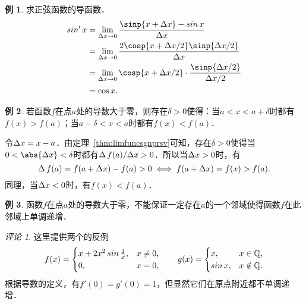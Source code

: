 \documentclass[a4paper,punct=CCT]{ctexbook}
\makeatletter
\theoremstyle{definition}
\newtheorem*{example*}{例}
\theoremstyle{remark}
\newtheorem*{remark}{评论}
\renewcommand*{\proofname}{证}
\renewenvironment{proof}[1][\proofname]{\par
  \pushQED{\qed}%
  \normalfont \topsep6\p@\@plus6\p@\relax
  \trivlist
  \item[\hskip\labelsep
    \bfseries
    #1%
    ]\ignorespaces
}{%
  \popQED\endtrivlist\@endpefalse
}
\makeatother
\begin{document}
\begin{example*}
  求正弦函数的导函数．
  \begin{align*}
    \sin'x
    &= \lim_{\fwdf x \to 0} \frac{\sinp{x+\fwdf x}- \sin x}{\fwdf x} \\
    &= \lim_{\fwdf x \to 0} \frac{2 \cosp{x+\fwdf x/2} \sinp{\fwdf x/2}}{\fwdf x} \\
    &= \lim_{\fwdf x \to 0} \cosp{x+\fwdf x/2} \cdot \frac{\sinp{\fwdf x/2}}{\fwdf x/2} \\
    &= \cos x.
  \end{align*}
\end{example*}

\begin{example*}
  若函数\(f\)在点\(a\)处的导数大于零，则存在\(\delta > 0\)使得：当\(a < x < a+\delta\)时都有\(f(x) > f(a)\)；当\(a-\delta < x < a\)时都有\(f(x) < f(a)\)．

  \begin{proof}
    令\(\mathop{}\!\Delta x = x - a\)．由定理~\ref{thm:limfuncsgnprsv}可知，存在\(\delta > 0\)使得当\(0 < \abs{\fwdf x} < \delta\)时都有\(\mathop{}\!\Delta\,f(a)/\!\mathop{}\!\Delta x > 0\)．所以当\(\mathop{}\!\Delta x > 0\)时，有
    \begin{equation*}
      \mathop{}\!\Delta\,f(a) = f(a+\mathop{}\!\Delta x) - f(a) > 0
      \iff
      f(a+\mathop{}\!\Delta x) = f(x) > f(a).
    \end{equation*}
    同理，当\(\mathop{}\!\Delta x < 0\)时，有\(f(x) < f(a)\)．
  \end{proof}
\end{example*}

\begin{example*}
  函数\(f\)在点\(a\)处的导数大于零，不能保证一定存在\(a\)的一个邻域使得函数\(f\)在此邻域上单调递增．

  \begin{remark}
    这里提供两个的反例
    \begin{equation*}
      f(x) =
      \begin{cases}
        x + 2 x^2 \operatorname{\smash{sin}}\frac1x, & x \ne 0, \\
        0, & x = 0,
      \end{cases}
      \qquad
      g(x) =
      \begin{cases}
        x, & x \in \mathbb{Q}, \\
        \operatorname{\smash{sin}} x, & x \notin \mathbb{Q}.
      \end{cases}
    \end{equation*}
    根据导数的定义，有\(f'(0) = g'(0) = 1\)，但显然它们在原点附近都不单调递增．
  \end{remark}
\end{example*}
\end{document}
